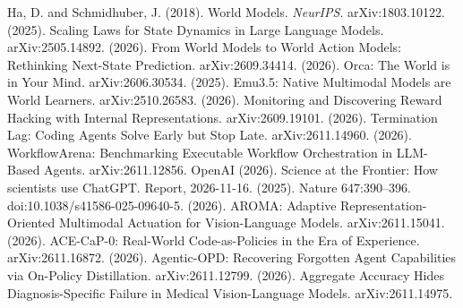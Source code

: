  Ha, D. and Schmidhuber, J. (2018). World Models. \emph{NeurIPS}. arXiv:1803.10122.
 (2025). Scaling Laws for State Dynamics in Large Language Models. arXiv:2505.14892.
 (2026). From World Models to World Action Models: Rethinking Next-State Prediction. arXiv:2609.34414.
 (2026). Orca: The World is in Your Mind. arXiv:2606.30534.
 (2025). Emu3.5: Native Multimodal Models are World Learners. arXiv:2510.26583.
 (2026). Monitoring and Discovering Reward Hacking with Internal Representations. arXiv:2609.19101.
 (2026). Termination Lag: Coding Agents Solve Early but Stop Late. arXiv:2611.14960.
 (2026). WorkflowArena: Benchmarking Executable Workflow Orchestration in LLM-Based Agents. arXiv:2611.12856.
 OpenAI (2026). Science at the Frontier: How scientists use ChatGPT. Report, 2026-11-16.
 (2025). Nature 647:390--396. doi:10.1038/s41586-025-09640-5.
 (2026). AROMA: Adaptive Representation-Oriented Multimodal Actuation for Vision-Language Models. arXiv:2611.15041.
 (2026). ACE-CaP-0: Real-World Code-as-Policies in the Era of Experience. arXiv:2611.16872.
 (2026). Agentic-OPD: Recovering Forgotten Agent Capabilities via On-Policy Distillation. arXiv:2611.12799.
 (2026). Aggregate Accuracy Hides Diagnosis-Specific Failure in Medical Vision-Language Models. arXiv:2611.14975.